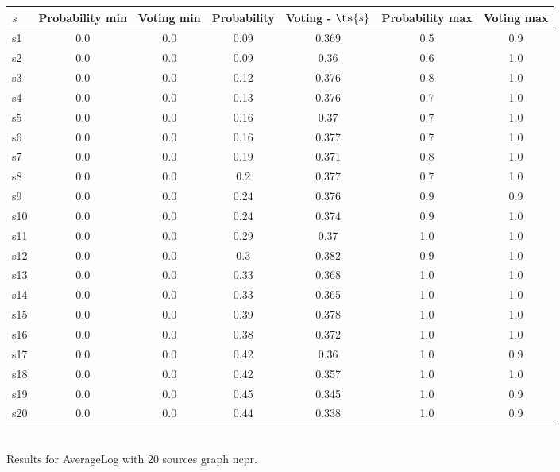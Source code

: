 \documentclass{article}
\begin{document}
\noindent\begin{tabular}{|l|c|c|c|c|c|c|}
\hline
$s$& Probability min & Voting min & Probability & Voting - $\ts{s}$ & Probability max & Voting max\\
\hline
s1 &0.0 & 0.0 & 0.09 & 0.369 & 0.5 & 0.9\\
\hline
s2 &0.0 & 0.0 & 0.09 & 0.36 & 0.6 & 1.0\\
\hline
s3 &0.0 & 0.0 & 0.12 & 0.376 & 0.8 & 1.0\\
\hline
s4 &0.0 & 0.0 & 0.13 & 0.376 & 0.7 & 1.0\\
\hline
s5 &0.0 & 0.0 & 0.16 & 0.37 & 0.7 & 1.0\\
\hline
s6 &0.0 & 0.0 & 0.16 & 0.377 & 0.7 & 1.0\\
\hline
s7 &0.0 & 0.0 & 0.19 & 0.371 & 0.8 & 1.0\\
\hline
s8 &0.0 & 0.0 & 0.2 & 0.377 & 0.7 & 1.0\\
\hline
s9 &0.0 & 0.0 & 0.24 & 0.376 & 0.9 & 0.9\\
\hline
s10 &0.0 & 0.0 & 0.24 & 0.374 & 0.9 & 1.0\\
\hline
s11 &0.0 & 0.0 & 0.29 & 0.37 & 1.0 & 1.0\\
\hline
s12 &0.0 & 0.0 & 0.3 & 0.382 & 0.9 & 1.0\\
\hline
s13 &0.0 & 0.0 & 0.33 & 0.368 & 1.0 & 1.0\\
\hline
s14 &0.0 & 0.0 & 0.33 & 0.365 & 1.0 & 1.0\\
\hline
s15 &0.0 & 0.0 & 0.39 & 0.378 & 1.0 & 1.0\\
\hline
s16 &0.0 & 0.0 & 0.38 & 0.372 & 1.0 & 1.0\\
\hline
s17 &0.0 & 0.0 & 0.42 & 0.36 & 1.0 & 0.9\\
\hline
s18 &0.0 & 0.0 & 0.42 & 0.357 & 1.0 & 1.0\\
\hline
s19 &0.0 & 0.0 & 0.45 & 0.345 & 1.0 & 0.9\\
\hline
s20 &0.0 & 0.0 & 0.44 & 0.338 & 1.0 & 0.9\\
\hline
\end{tabular}\\

\noindent Results for AverageLog with 20 sources graph ncpr.
\end{document}
